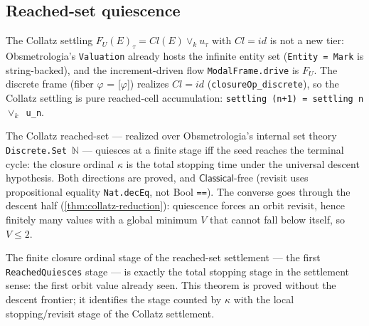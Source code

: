 \subsection{Reached-set quiescence}

\begin{theorem}[Collatz settlement realised ($Cl = id$)]
  \label{thm:collatz-settlement-realised}
  \leanok
  The Collatz settling $F_U(E)_\tau = Cl(E)\vee_k u_\tau$ with $Cl=id$ is not a
  new tier: Obsmetrologia's \texttt{Valuation} already hosts the infinite entity set
  (\texttt{Entity = Mark} is string-backed), and the increment-driven flow
  \texttt{ModalFrame.drive} is $F_U$. The discrete frame
  (fiber $\varphi$ = [$\varphi$]) realizes $Cl=id$ (\texttt{closureOp\_discrete}),
  so the Collatz settling is pure reached-cell accumulation:
  \texttt{settling (n+1) = settling n $\vee_k$ u_n}.
\end{theorem}

\begin{theorem}
  \label{thm:collatz-kappa-stopping-time}
  \leanok
  The Collatz reached-set --- realized over Obsmetrologia's internal set theory
  \texttt{Discrete.Set}~$\mathbb{N}$ --- quiesces at a finite stage iff the seed
  reaches the terminal cycle: the closure ordinal $\kappa$ is the total stopping
  time under the universal descent hypothesis. Both directions are proved, and
  $\mathsf{Classical}$-free
  (revisit uses propositional equality \texttt{Nat.decEq}, not Bool
  \texttt{==}). The converse goes through the descent half
  (\cref{thm:collatz-reduction}): quiescence forces an orbit revisit, hence
  finitely many values with a global minimum $V$ that cannot fall below itself,
  so $V\le 2$.
\end{theorem}

\begin{theorem}
  \label{thm:collatz-kappa-is-total-stopping-stage}
  \leanok
  The finite closure ordinal stage of the reached-set settlement --- the first
  \texttt{ReachedQuiesces} stage --- is exactly the total stopping stage in the
  settlement sense: the first orbit value already seen. This theorem is proved without
  the descent frontier; it identifies the stage counted by $\kappa$ with the local
  stopping/revisit stage of the Collatz settlement.
\end{theorem}

